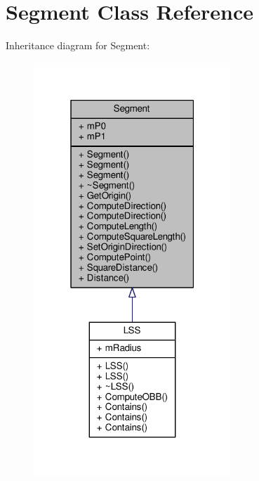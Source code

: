 \hypertarget{classSegment}{}\section{Segment Class Reference}
\label{classSegment}


Inheritance diagram for Segment\+:
\nopagebreak
\begin{figure}[H]
\begin{center}
\leavevmode
\includegraphics[width=211pt]{d7/dd7/classSegment__inherit__graph}
\end{center}
\end{figure}


